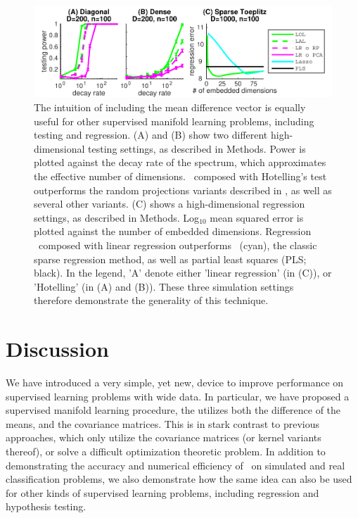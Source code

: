 \documentclass[10pt]{article}
\begin{document}
\begin{figure}
\centering
\includegraphics[width=1\linewidth]{../Figs/regression_power.pdf}
\caption{
The intuition of including the mean difference vector is equally useful for other supervised manifold learning problems, including testing and regression.
(A) and (B) show two different high-dimensional testing settings, as described in Methods.  Power is plotted against the decay rate of the spectrum, which approximates the effective number of dimensions.  \Lol~composed with Hotelling's test outperforms the random projections variants described in \cite{Lopes2011}, as well as several other variants.
(C) shows a high-dimensional regression settings, as described in Methods.  Log$_{10}$ mean squared error is plotted against the number of embedded dimensions.  
Regression \Lol~composed with linear regression outperforms ~(cyan), the classic sparse regression method, as well as partial least squares (PLS; black).
In the legend, 'A' denote either 'linear regression' (in (C)), or 'Hotelling' (in (A) and (B)).
These three simulation settings therefore demonstrate the generality of this technique.
}
\label{fig:generalizations}
\end{figure}


\section*{Discussion}


We have introduced a very simple, yet new, device to improve performance on supervised learning problems with wide data.  In particular, we have proposed a supervised manifold learning procedure, the utilizes both the difference of the means, and the covariance matrices.  This is in stark contrast to previous approaches, which only utilize the covariance matrices (or kernel variants thereof), or solve a difficult optimization theoretic problem.  In addition to demonstrating the accuracy and numerical efficiency of \Lol~on simulated and real classification problems, we also demonstrate how the same idea can also be used for other kinds of supervised learning problems, including regression and hypothesis testing.
\end{document}
